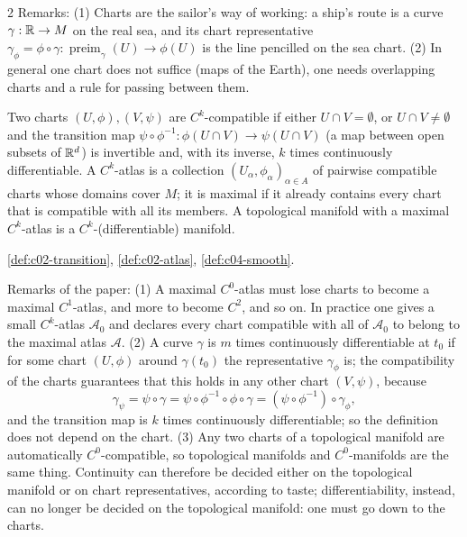 \begin{paracol}{2}
Remarks: (1) Charts are the sailor's way of working: a ship's route is a curve $\gamma:\mathbb{R}\to M$ on the real sea, and its chart representative $\gamma_\phi=\phi\circ\gamma:\operatorname{preim}_\gamma(U)\to\phi(U)$ is the line pencilled on the sea chart. (2) In general one chart does not suffice (maps of the Earth), one needs overlapping charts and a rule for passing between them.

\begin{definition}\label{def:c29-atlas}
Two charts $(U,\phi),(V,\psi)$ are $C^k$-compatible if either $U\cap V=\emptyset$, or $U\cap V\ne\emptyset$ and the transition map $\psi\circ\phi^{-1}:\phi(U\cap V)\to\psi(U\cap V)$ (a map between open subsets of $\mathbb{R}^d$) is invertible and, with its inverse, $k$ times continuously differentiable. A $C^k$-atlas is a collection $(U_\alpha,\phi_\alpha)_{\alpha\in A}$ of pairwise compatible charts whose domains cover $M$; it is maximal if it already contains every chart that is compatible with all its members. A topological manifold with a maximal $C^k$-atlas is a $C^k$-(differentiable) manifold.
\end{definition}
\begin{recall}[Atlas]
\cref{def:c02-transition}, \cref{def:c02-atlas}, \cref{def:c04-smooth}.
\end{recall}

Remarks of the paper: (1) A maximal $C^0$-atlas must lose charts to become a maximal $C^1$-atlas, and more to become $C^2$, and so on. In practice one gives a small $C^k$-atlas $\mathcal A_0$ and declares every chart compatible with all of $\mathcal A_0$ to belong to the maximal atlas $\mathcal A$. (2) A curve $\gamma$ is $m$ times continuously differentiable at $t_0$ if for some chart $(U,\phi)$ around $\gamma(t_0)$ the representative $\gamma_\phi$ is; the compatibility of the charts guarantees that this holds in any other chart $(V,\psi)$, because
\[
  \gamma_\psi=\psi\circ\gamma=\psi\circ\phi^{-1}\circ\phi\circ\gamma=(\psi\circ\phi^{-1})\circ\gamma_\phi,
\]
and the transition map is $k$ times continuously differentiable; so the definition does not depend on the chart. (3) Any two charts of a topological manifold are automatically $C^0$-compatible, so topological manifolds and $C^0$-manifolds are the same thing. Continuity can therefore be decided either on the topological manifold or on chart representatives, according to taste; differentiability, instead, can no longer be decided on the topological manifold: one must go down to the charts.


\end{paracol}
